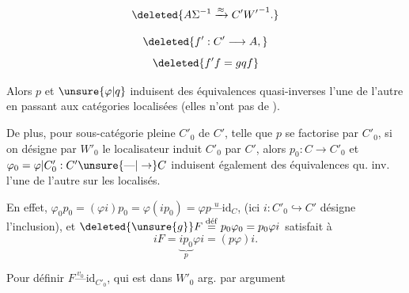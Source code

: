 
\[ \deleted{A\Sigma^{-1}\xrightarrow{\approx} C'{W'}^{-1}.} \]

\[ \deleted{f':C'\longrightarrow A,} \]
\[ \deleted{f'f=gqf} \]

Alors $p$ et $\unsure{\varphi|q}$ induisent des  équivalences quasi-inverses l'une de l'autre en passant aux catégories localisées (elles n'ont pas de ).

De plus, pour  sous-catégorie pleine $C'_0$ de $C'$, telle que  $p$ se factorise  par $C'_0$, si on désigne par $W'_0$ le localisateur induit  $C'_0$ par $C'$,  alors $p_0:C\to C'_0$ et $\varphi_0=\varphi\vert C'_0:C'\unsure{\text{---}|\to}C$ induisent également des équivalences qu. inv. l'une de l'autre sur les localisés.

En effet, $\varphi_0p_0=(\varphi i)p_0=\varphi(ip_0)=\varphi p\overset{u}{\text{---}}\mathrm{id}_C$, (ici $i:C'_0\hookrightarrow C'$ désigne l'inclusion), et $\deleted{\unsure{g}}F\overset{\mathrm{d\acute ef}}{=}p_0\varphi_0=p_0\varphi i$ satisfait à
\[ iF=\underbrace{ip_0}_{p}\varphi i=(p\varphi)i. \]

Pour définir  $F\overset{v_0}{\text{---}}\mathrm{id}_{C'_0}$, qui est dans $W'_0$ arg. par argument

